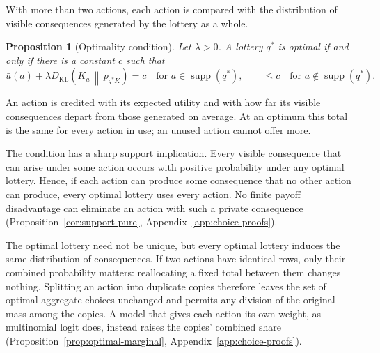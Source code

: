 \documentclass[11pt,a4paper]{article}
\newtheorem{proposition}[theorem]{Proposition}
\theoremstyle{definition}
\newcommand{\supp}{\operatorname{supp}}
\newcommand{\KL}{D_{\mathrm{KL}}}
\newcommand{\1}{\mathbf 1}
\begin{document}
With more than two actions, each action is compared with the distribution of visible consequences generated by
the lottery as a whole.

\begin{proposition}[Optimality condition]\label{prop:optimal-choice}
Let $\lambda>0$.  A lottery $q^*$ is optimal if and only if there is a constant $c$ such that
\[
 \bar u(a)+\lambda\KL\!\left(K_a\,\middle\|\,p_{q^*K}\right)=c
 \quad\text{for }a\in\supp(q^*),
 \qquad
 \le c\quad\text{for }a\notin\supp(q^*).
\]
\end{proposition}

An action is credited with its expected utility and with how far its visible consequences depart from those
generated on average.  At an optimum this total is the same for every action in use; an unused action cannot
offer more.

The condition has a sharp support implication.  Every visible consequence that can arise under some action
occurs with positive probability under any optimal lottery.  Hence, if each action can produce some consequence
that no other action can produce, every optimal lottery uses every action.  No finite payoff disadvantage can
eliminate an action with such a private consequence (Proposition~\ref{cor:support-pure},
Appendix~\ref{app:choice-proofs}).

The optimal lottery need not be unique, but every optimal lottery induces the same distribution of 
consequences.  If two actions have identical rows, only their combined probability matters: reallocating a fixed
total between them changes nothing.  Splitting an action into duplicate copies therefore leaves the set of
optimal aggregate choices unchanged and permits any division of the original mass among the copies.  A model
that gives each action its own weight, as multinomial logit does, instead raises the copies' combined share
(Proposition~\ref{prop:optimal-marginal}, Appendix~\ref{app:choice-proofs}).
\end{document}
